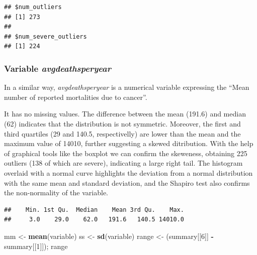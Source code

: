 \documentclass[
]{article}
\newenvironment{Shaded}{\begin{snugshade}}{\end{snugshade}}
\newcommand{\DecValTok}[1]{\textcolor[rgb]{0.00,0.00,0.81}{#1}}
\newcommand{\FunctionTok}[1]{\textcolor[rgb]{0.13,0.29,0.53}{\textbf{#1}}}
\newcommand{\NormalTok}[1]{#1}
\newcommand{\OtherTok}[1]{\textcolor[rgb]{0.56,0.35,0.01}{#1}}
\newcommand{\SpecialCharTok}[1]{\textcolor[rgb]{0.81,0.36,0.00}{\textbf{#1}}}
\begin{document}
\begin{verbatim}
## $num_outliers
## [1] 273
## 
## $num_severe_outliers
## [1] 224
\end{verbatim}

\subsubsection{\texorpdfstring{Variable
\emph{avgdeathsperyear}}{Variable avgdeathsperyear}}\label{variable-avgdeathsperyear}

In a similar way, \emph{avgdeathsperyear} is a numerical variable
expressing the ``Mean number of reported mortalities due to cancer''.

It has no missing values. The difference between the mean (191.6) and
median (62) indicates that the distribution is not symmetric. Moreover,
the first and third quartiles (29 and 140.5, respectivelly) are lower
than the mean and the maximum value of 14010, further suggesting a
skewed ditribution. With the help of graphical tools like the boxplot we
can confirm the skeweness, obtaining 225 outliers (138 of which are
severe), indicating a large right tail. The histogram overlaid with a
normal curve highlights the deviation from a normal distribution with
the same mean and standard deviation, and the Shapiro test also confirms
the non-normality of the variable.

\begin{Shaded}
\end{Shaded}

\begin{verbatim}
##    Min. 1st Qu.  Median    Mean 3rd Qu.    Max. 
##     3.0    29.0    62.0   191.6   140.5 14010.0
\end{verbatim}

\begin{Shaded}
\begin{Highlighting}[]
\NormalTok{mm }\OtherTok{\textless{}{-}} \FunctionTok{mean}\NormalTok{(variable)}
\NormalTok{ss }\OtherTok{\textless{}{-}} \FunctionTok{sd}\NormalTok{(variable)}
\NormalTok{range }\OtherTok{\textless{}{-}}\NormalTok{ (summary[[}\DecValTok{6}\NormalTok{]] }\SpecialCharTok{{-}}\NormalTok{ summary[[}\DecValTok{1}\NormalTok{]]); range}
\end{Highlighting}
\end{Shaded}
\end{document}
